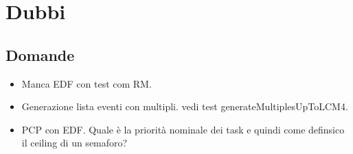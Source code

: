 \chapter{Dubbi}

\section{Domande}
\begin{itemize}
    \item Manca EDF con test com RM.

    \item Generazione lista eventi con multipli. vedi test generateMultiplesUpToLCM4.
    \item PCP con EDF. Quale è la priorità nominale dei task e quindi come definsico il ceiling di un semaforo?
\end{itemize}